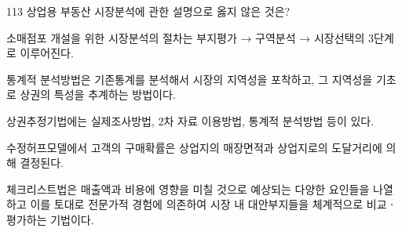 \begin{question}{113}
상업용 부동산 시장분석에 관한 설명으로 옳지 않은 것은?
\begin{choices}
  \item 소매점포 개설을 위한 시장분석의 절차는 부지평가 → 구역분석 → 시장선택의 3단계로 이루어진다.
  \item 통계적 분석방법은 기존통계를 분석해서 시장의 지역성을 포착하고, 그 지역성을 기초로 상권의 특성을 추계하는 방법이다.
  \item 상권추정기법에는 실제조사방법, 2차 자료 이용방법, 통계적 분석방법 등이 있다.
  \item 수정허프모델에서 고객의 구매확률은 상업지의 매장면적과 상업지로의 도달거리에 의해 결정된다.
  \item 체크리스트법은 매출액과 비용에 영향을 미칠 것으로 예상되는 다양한 요인들을 나열하고 이를 토대로 전문가적 경험에 의존하여 시장 내 대안부지들을 체계적으로 비교ㆍ평가하는 기법이다.
\end{choices}
\end{question}
